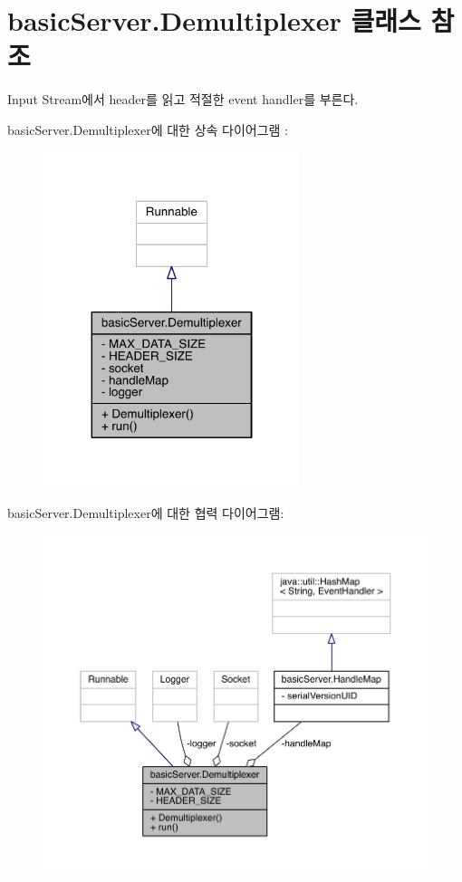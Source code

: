 \hypertarget{classbasic_server_1_1_demultiplexer}{\section{basic\+Server.\+Demultiplexer 클래스 참조}
\label{classbasic_server_1_1_demultiplexer}
}


Input Stream에서 header를 읽고 적절한 event handler를 부른다.  




basic\+Server.\+Demultiplexer에 대한 상속 다이어그램 \+: \nopagebreak
\begin{figure}[H]
\begin{center}
\leavevmode
\includegraphics[width=212pt]{classbasic_server_1_1_demultiplexer__inherit__graph}
\end{center}
\end{figure}


basic\+Server.\+Demultiplexer에 대한 협력 다이어그램\+:
\nopagebreak
\begin{figure}[H]
\begin{center}
\leavevmode
\includegraphics[width=350pt]{classbasic_server_1_1_demultiplexer__coll__graph}
\end{center}
\end{figure}

